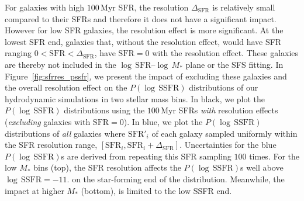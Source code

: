 \documentclass[preprint2,tighten]{aastex62}
\begin{document}
For galaxies with high $100\,\mathrm{Myr}$ SFR, the resolution 
$\Delta_\mathrm{SFR}$ is relatively small compared to their SFRs and
therefore it does not have a significant impact. However for low SFR 
galaxies, the resolution effect is more significant. At the lowest SFR 
end, galaxies that, without the resolution effect, would have SFR ranging 
$0 < \mathrm{SFR} < \Delta_\mathrm{SFR}$, have $\mathrm{SFR}{=}0$ with 
the resolution effect. These galaxies are thereby not included in the 
$\log\,\mathrm{SFR}$--$\log\,M_*$ plane or the SFS fitting. In
Figure~\ref{fig:sfrres_pssfr}, we present the impact of excluding these
galaxies and the overall resolution effect on the $P(\log\,\mathrm{SSFR})$ 
distributions of our hydrodynamic simulations in two stellar mass bins. In 
black, we plot the $P(\log\,\mathrm{SSFR})$ distributions using the 
$100\,\mathrm{Myr}$ SFRs \emph{with} resolution effects
(\emph{excluding} galaxies with $\mathrm{SFR}{=}0$). In blue, we plot the 
$P(\log\,\mathrm{SSFR})$ distributions of \emph{all} galaxies where
$\mathrm{SFR}'_i$ of each galaxy sampled uniformly within the SFR resolution range, 
$[\mathrm{SFR}_i, \mathrm{SFR}_i+\Delta_\mathrm{SFR}]$. Uncertainties 
for the blue $P(\log\,\mathrm{SSFR})$s are derived from repeating this 
SFR sampling $100$ times. For the low $M_*$ bins (top), the SFR resolution 
affects the $P(\log\,\mathrm{SSFR})$s well above $\log\,\mathrm{SSFR}{=}-11.$ 
on the star-forming end of the distribution. Meanwhile, the impact at higher
$M_*$ (bottom), is limited to the low SSFR end. 
\end{document}
